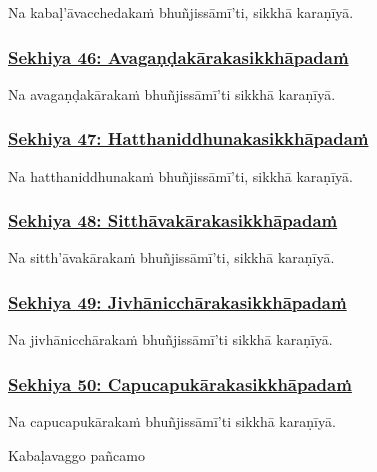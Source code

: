 Na kabaḷ'āvacchedakaṁ bhuñjissāmī'ti, sikkhā karaṇīyā.



\subsubsection*{\hyperref[training46]{Sekhiya 46: Avagaṇḍakārakasikkhāpadaṁ}}
\label{sekh46}

Na avagaṇḍakārakaṁ bhuñjissāmī'ti sikkhā karaṇīyā.



\subsubsection*{\hyperref[training47]{Sekhiya 47: Hatthaniddhunakasikkhāpadaṁ}}
\label{sekh47}

Na hatthaniddhunakaṁ bhuñjissāmī'ti, sikkhā karaṇīyā.



\subsubsection*{\hyperref[training48]{Sekhiya 48: Sitthāvakārakasikkhāpadaṁ}}
\label{sekh48}

Na sitth'āvakārakaṁ bhuñjissāmī'ti, sikkhā karaṇīyā.



\subsubsection*{\hyperref[training49]{Sekhiya 49: Jivhānicchārakasikkhāpadaṁ}}
\label{sekh49}

Na jivhānicchārakaṁ bhuñjissāmī'ti sikkhā karaṇīyā.



\subsubsection*{\hyperref[training50]{Sekhiya 50: Capucapukārakasikkhāpadaṁ}}
\label{sekh50}

Na capucapukārakaṁ bhuñjissāmī'ti sikkhā karaṇīyā.

\begin{center}
	Kabaḷavaggo pañcamo
\end{center}



